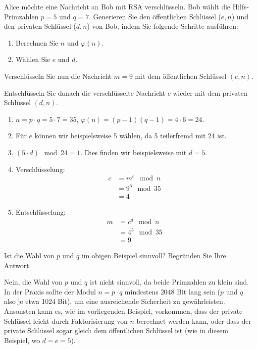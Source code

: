 \begin{myexercise}\label{myexercise:rsa}
	Alice möchte eine Nachricht an Bob mit \gls{RSA} verschlüsseln. Bob wählt die Hilfs-Primzahlen \( p = 5 \) und \( q = 7 \). Generieren Sie den öffentlichen Schlüssel ($e, n$) und den privaten Schlüssel ($d, n$) von Bob, indem Sie folgende Schritte ausführen:
	\begin{enumerate}
		\item Berechnen Sie \( n \) und \( \varphi(n) \).
		\item Wählen Sie $e$ und $d$.
	\end{enumerate}

	Verschlüsseln Sie nun die Nachricht \( m = 9 \) mit dem öffentlichen Schlüssel \( (e, n) \).

	Entschlüsseln Sie danach die verschlüsselte Nachricht \( c \) wieder mit dem privaten Schlüssel \( (d, n) \).
	\begin{myanswer}
		\begin{enumerate}
			\item \( n = p \cdot q = 5 \cdot 7 = 35 \), \( \varphi(n) = (p-1)(q-1) = 4 \cdot 6 = 24 \).
			\item Für $e$ können wir beispielsweise 5 wählen, da 5 teilerfremd mit 24 ist.
			\item \( (5 \cdot d) \mod 24 = 1\). Dies finden wir beispielsweise mit \( d = 5 \).
			\item Verschlüsselung:
			      \begin{align*}
				      c & = m^e\mod n   \\
				        & = 9^5 \mod 35 \\
				        & = 4
			      \end{align*}
			\item Entschlüsselung:
			      \begin{align*}
				      m & = c^d\mod n    \\
				        & =4^{5} \mod 35 \\
				        & = 9
			      \end{align*}
		\end{enumerate}
	\end{myanswer}
\end{myexercise}

\begin{myexercise}
	Ist die Wahl von \( p \) und \( q \) im obigen Beispiel sinnvoll? Begründen Sie Ihre Antwort.
	\begin{myanswer}
		Nein, die Wahl von \( p \) und \( q \) ist nicht sinnvoll, da beide Primzahlen zu klein sind. In der Praxis sollte der Modul \( n = p \cdot q \) mindestens 2048 Bit lang sein (\( p \) und \( q \) also je etwa 1024 Bit), um eine ausreichende Sicherheit zu gewährleisten. Ansonsten kann es, wie im vorliegenden Beispiel, vorkommen, dass der private Schlüssel leicht durch Faktorisierung von \( n \) berechnet werden kann, oder dass der private Schlüssel sogar gleich dem öffentlichen Schlüssel ist (wie in diesem Beispiel, wo \( d = e = 5 \)).
	\end{myanswer}
\end{myexercise}

